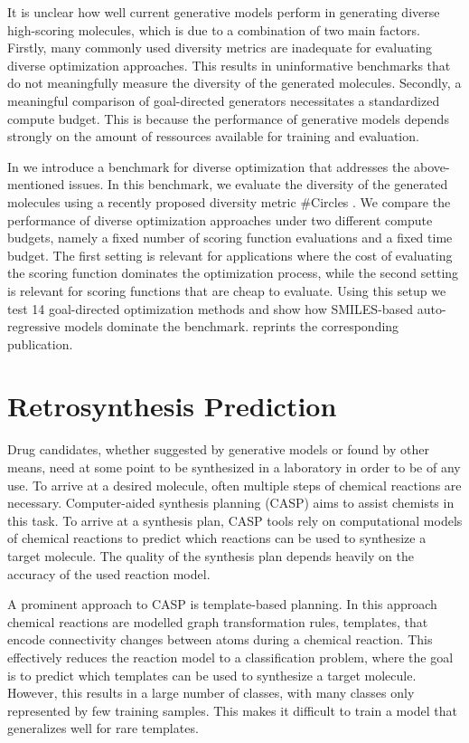 It is unclear how well current generative models perform in generating diverse
high-scoring molecules, which is due to a combination of two main factors. 
Firstly, many commonly used diversity metrics are inadequate for evaluating
diverse optimization approaches. This results in uninformative benchmarks that
do not meaningfully measure the diversity of the generated molecules. Secondly,
a meaningful comparison of goal-directed generators necessitates a standardized
compute budget. This is because the performance of generative models depends strongly 
on the amount of ressources available for training and evaluation.

In \citep{renzBenchmarkingEfficiencyGenerative2024} we introduce a benchmark for
diverse optimization that addresses the above-mentioned issues. In this
benchmark, we evaluate the diversity of the generated molecules using a recently
proposed diversity metric \#Circles \citep{xieHowMuchSpace2023}. We compare the
performance of diverse optimization approaches under two different compute
budgets, namely a fixed number of scoring function evaluations and a fixed time
budget. The first setting is relevant for applications where the cost of
evaluating the scoring function dominates the optimization process, while the
second setting is relevant for scoring functions that are cheap to evaluate.
Using this setup we test 14 goal-directed optimization methods and show how
SMILES-based auto-regressive models dominate the benchmark.
 reprints the corresponding publication.

\section{Retrosynthesis Prediction\label{sec:retrosynthesis}}
Drug candidates, whether suggested by generative models or found by other means,
need at some point to be synthesized in a laboratory in order to be of any use.
To arrive at a desired molecule, often multiple steps of chemical reactions are
necessary. Computer-aided synthesis planning (CASP) aims to assist chemists in
this task. To arrive at a synthesis plan, CASP tools rely on computational
models of chemical reactions to predict which reactions can be used to
synthesize a target molecule. The quality of the synthesis plan depends heavily
on the accuracy of the used reaction model.

A prominent approach to CASP is template-based planning. In this approach
chemical reactions are modelled graph transformation rules, templates, that
encode connectivity changes between atoms during a chemical reaction.
This effectively reduces the reaction model to a classification problem, where
the goal is to predict which templates can be used to synthesize a target molecule.
However, this results in a large number of classes, with many classes only
represented by few training samples. This makes it difficult to train a model
that generalizes well for rare templates.

